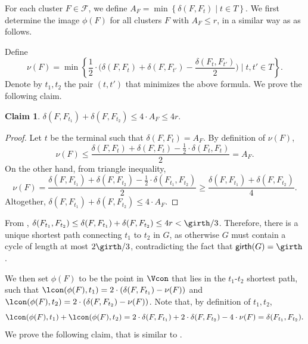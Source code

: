 \documentclass[11pt]{article}
\theoremstyle{definition}
\newtheorem{claim}[theorem]{Claim}
\newcommand{\set}[1]{\left\{ #1 \right\}}
\newcommand{\fset}{{\mathcal{F}}}
\newcommand{\gir}{\textnormal{\textsf{girth}}}
\newcounter{note}
\newcommand{\znote}[1]{\refstepcounter{note}$\ll${\bf ZT~\thenote:}
	{\sf \color{red} #1}$\gg$\marginpar{\tiny\bf ZT~\thenote}}
\begin{document}
For each cluster $F\in \fset$, we define $A_F=\min\set{\delta(F,F_t)\mid t\in T}$.
We first determine the image $\phi(F)$ for all clusters $F$ with $A_F \le r$, in a similar way as  as follows.

Define \[\nu(F)=\min\set{\frac{1}{2}\cdot \bigg(\delta(F,F_t)+\delta(F,F_{t'})-\frac{\delta(F_t,F_{t'})}{2}\bigg)\mid t,t'\in T}.\]
Denote by $t_1,t_2$ the pair $(t,t')$ that minimizes the above formula. We prove the following claim.

\begin{claim} \label{clm:g-tree}
$\delta(F,F_{t_1}) + \delta(F,F_{t_2}) \le 4\cdot A_F \le 4r$.
\end{claim}
\begin{proof}
Let $t$ be the terminal such that $\delta(F,F_t) = A_F$. By definition of $\nu(F)$, 
$$\nu(F) \le \frac{\delta(F,F_t)+\delta(F,F_t)- \frac{1}{2}\cdot \delta(F_t,F_t)}{2} = A_F.$$ 
On the other hand, from triangle inequality, %
$$\nu(F) = \frac{\delta(F,F_{t_1})+\delta(F,F_{t_2}) - \frac 1 2\cdot \delta(F_{t_1},F_{t_2})}{2} \ge \frac{\delta(F,F_{t_1})+\delta(F,F_{t_2})}{4}.$$ Altogether, $\delta(F,F_{t_1})+\delta(F,F_{t_2}) \le 4\cdot A_F$. 
\end{proof}

From , $\delta(F_{t_1},F_{t_2}) \le \delta(F,F_{t_1}) + \delta(F,F_{t_2})\le 4r < \girth/3$. Therefore, there is a unique shortest path connecting $t_1$ to $t_2$ in $G$, as otherwise $G$ must contain a cycle of length at most $2\girth/3$, contradicting the fact that $\gir(G)=\girth$. %
 
We then set $\phi(F)$ to be the point in $\Vcon$ that lies in the $t_1$-$t_2$ shortest path, such that $\lcon(\phi(F),t_1) = 2\cdot (\delta(F,F_{t_1}) - \nu(F))$ and $\lcon(\phi(F),t_2) = 2\cdot (\delta(F,F_{t_2}) - \nu(F))$. Note that, by definition of $t_1,t_2$,
\[
\lcon(\phi(F),t_1)+\lcon(\phi(F),t_2)=2\cdot \delta(F,F_{t_1}) +2\cdot \delta(F,F_{t_2}) - 4\cdot \nu(F)=\delta(F_{t_1},F_{t_2}).
\] 
We prove the following claim, that is similar to .
    
\end{document}
